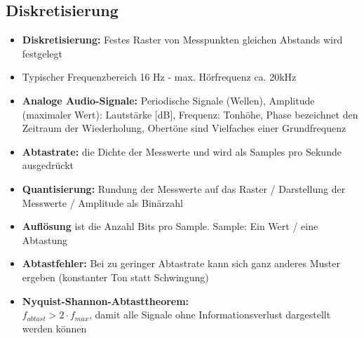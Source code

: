\documentclass[12pt,landscape]{article}
\begin{document}
\begin{multicols}{3}
\subsection{Diskretisierung}
\begin{itemize}
\item \textbf{Diskretisierung:} Festes Raster von Messpunkten gleichen Abstands wird festgelegt
\item Typischer Frequenzbereich 16 Hz - max. Hörfrequenz ca. 20kHz
\item \textbf{Analoge Audio-Signale:} Periodische Signale (Wellen), Amplitude (maximaler Wert): Lautstärke [dB], Frequenz: Tonhöhe, Phase bezeichnet den Zeitraum der Wiederholung, Obertöne sind Vielfaches einer Grundfrequenz
\item \textbf{Abtastrate:} die Dichte der Messwerte und wird als Samples pro Sekunde ausgedrückt
\item \textbf{Quantisierung:} Rundung der Messwerte auf das Raster / Darstellung  der Messwerte / Amplitude als Binärzahl
\item \textbf{Auflösung} ist die Anzahl Bits pro Sample. Sample: Ein Wert / eine Abtastung
\item \textbf{Abtastfehler:} Bei zu geringer Abtastrate kann sich ganz anderes Muster ergeben (konstanter Ton statt Schwingung)
\item \textbf{Nyquist-Shannon-Abtasttheorem:}\\$f_{abtast} > 2 \cdot f_{max}$, damit alle Signale ohne Informationsverlust dargestellt werden können
\end{itemize}

\end{multicols}
\end{document}

